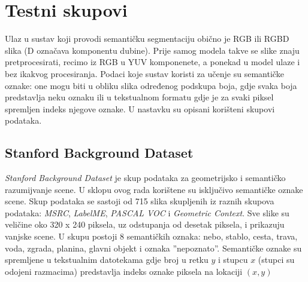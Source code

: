 \documentclass[times, utf8, diplomski, numeric]{fer}
\begin{document}
\section{Testni skupovi}

Ulaz u sustav koji provodi semantičku segmentaciju obično je RGB ili RGBD slika (D označava komponentu dubine). Prije samog modela takve se slike znaju pretprocesirati, recimo iz RGB u YUV komponenete, a ponekad u model ulaze i bez ikakvog procesiranja. Podaci koje sustav koristi za učenje su semantičke oznake: one mogu biti u obliku slika određenog podskupa boja, gdje svaka boja predstavlja neku oznaku ili u tekstualnom formatu gdje je za svaki piksel spremljen indeks njegove oznake. U nastavku su opisani korišteni skupovi podataka.


\subsection{Stanford Background Dataset}

\textit{Stanford Background Dataset}\cite{gould_09} je skup podataka za geometrijsko i semantičko razumijvanje scene. U sklopu ovog rada korištene su isključivo semantičke oznake scene. Skup podataka se sastoji od 715 slika skupljenih iz raznih skupova podataka: \textit{MSRC}, \textit{LabelME}, \textit{PASCAL VOC} i \textit{Geometric Context}. Sve slike su veličine oko 320 x 240 piksela, uz odstupanja od desetak piksela, i prikazuju vanjske scene.
U skupu postoji 8 semantičkih oznaka: nebo, stablo, cesta, trava, voda, zgrada, planina, glavni objekt i oznaka ''nepoznato''. Semantičke oznake su spremljene u tekstualnim datotekama gdje broj u retku $y$ i stupcu $x$ (stupci su odojeni razmacima) predstavlja indeks oznake piksela na lokaciji $(x, y)$

\begin{bchart}[step=5,max=40,unit=\%]
      \smallskip
      \smallskip
      \smallskip
      \smallskip
      \smallskip
      \smallskip
      \smallskip
      \smallskip
\end{bchart}
\end{document}
